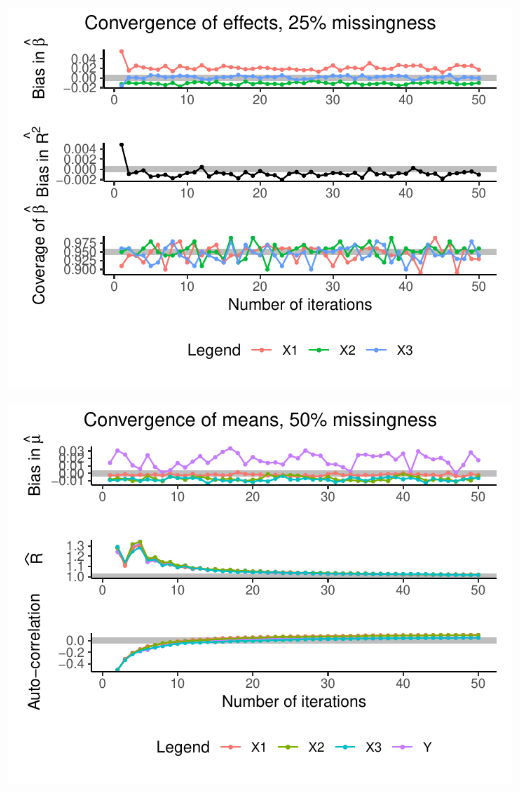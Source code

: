 \documentclass[Royal,times,sageh]{sagej}
\begin{document}
\begin{flushleft}\includegraphics{manuscript_files/figure-latex/unnamed-chunk-5-1} \end{flushleft}

\begin{flushleft}\includegraphics{manuscript_files/figure-latex/unnamed-chunk-7-1} \end{flushleft}
\end{document}
